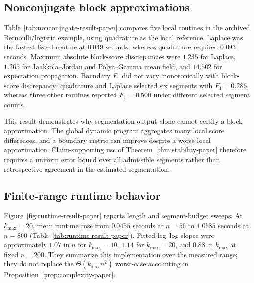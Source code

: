 \subsection{Nonconjugate block approximations}
Table~\ref{tab:nonconjugate-result-paper} compares five local routines in the archived Bernoulli/logistic example, using quadrature as the local reference. Laplace was the fastest listed routine at $0.049$ seconds, whereas quadrature required $0.093$ seconds. Maximum absolute block-score discrepancies were $1.235$ for Laplace, $1.265$ for Jaakkola--Jordan and P\'olya--Gamma mean field, and $14.502$ for expectation propagation. Boundary $F_1$ did not vary monotonically with block-score discrepancy: quadrature and Laplace selected six segments with $F_1=0.286$, whereas three other routines reported $F_1=0.500$ under different selected segment counts.

\begin{table}[t]
\centering
\scriptsize
\resizebox{0.97\textwidth}{!}{}
\caption{Executed local-approximation trade-off. The observed maximum errors are too large to treat this example as verification of a small uniform segmentwise error bound.}
\label{tab:nonconjugate-result-paper}
\end{table}

This result demonstrates why segmentation output alone cannot certify a block approximation. The global dynamic program aggregates many local score differences, and a boundary metric can improve despite a worse local approximation. Claim-supporting use of Theorem~\ref{thm:stability-paper} therefore requires a uniform error bound over all admissible segments rather than retrospective agreement in the estimated segmentation.

\subsection{Finite-range runtime behavior}
Figure~\ref{fig:runtime-result-paper} reports length and segment-budget sweeps. At $k_{\max}=20$, mean runtime rose from $0.0455$ seconds at $n=50$ to $1.0585$ seconds at $n=800$ (Table~\ref{tab:runtime-result-paper}). Fitted log--log slopes were approximately $1.07$ in $n$ for $k_{\max}=10$, $1.14$ for $k_{\max}=20$, and $0.88$ in $k_{\max}$ at fixed $n=200$. They summarize this implementation over the measured range; they do not replace the $\Theta(k_{\max}n^2)$ worst-case accounting in Proposition~\ref{prop:complexity-paper}.

